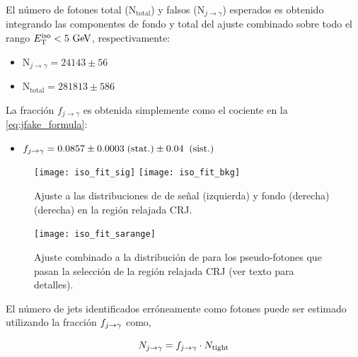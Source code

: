 
El número de fotones total (N$_\text{total}$) y falsos (N$_{j\to\gamma}$)
esperados es obtenido integrando las componentes de fondo y total del ajuste
combinado sobre todo el rango $\etiso<5\gev$, respectivamente:

\begin{itemize}
\item[] N$_{j\to\gamma}= 24143 \pm 56$

\item[] N$_\text{total} = 281813 \pm 586$
\end{itemize}

La fracción $f_{j\to \gamma}$ es obtenida simplemente como el cociente
en la \cref{eq:jfake_formula}:

\begin{itemize}
\item[] $f_{j\rightarrow\gamma} = 0.0857 \pm 0.0003 \mbox{$\;$(stat.)} \pm 0.04 \;\mbox{$\;$(sist.)}$
\end{itemize}

\begin{figure}[!h]
  \centering

  \texttt{[image: iso\_fit\_sig]}  \hfill
  \texttt{[image: iso\_fit\_bkg]}

  \caption{Ajuste a las distribuciones de {\etiso} de señal (izquierda)
    y fondo (derecha) (derecha) en la región relajada CRJ.}
  \label{fig:jetfake_sigbkg}

\end{figure}

\begin{figure}[!h]
  \centering

  \texttt{[image: iso\_fit\_sarange]}

  \caption{Ajuste combinado a la distribución de {\etiso}
    para los pseudo-fotones que pasan la selección de la región
    relajada CRJ (ver texto para detalles).}
  \label{fig:jetfake_combfit}

\end{figure}


El número de jets identificados erróneamente como fotones puede ser estimado
utilizando la fracción $f_{j\rightarrow\gamma}$ como,

\begin{equation}\label{eq:njfakes}
  N_{j\rightarrow\gamma} = f_{j\rightarrow\gamma} \cdot N_\mathrm{tight}
\end{equation}

